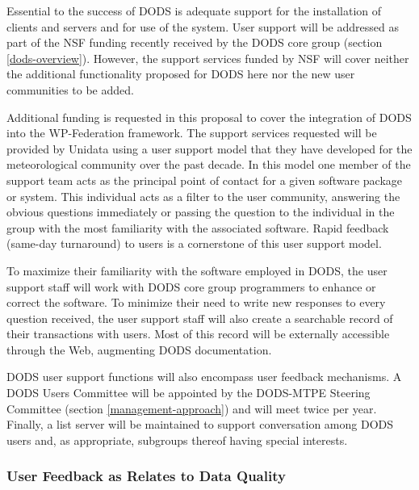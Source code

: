 \documentclass[12pt]{article}
\begin{document}
Essential to the success of \ac{DODS} is adequate support for the 
installation of clients and servers and for use of the system. User 
support will be addressed as part of the \acs{NSF} funding recently 
received by the \ac{DODS} core group (section \ref{dods-overview}).
However, the support services funded by \acs{NSF} will cover neither
the additional functionality proposed for \ac{DODS} here nor the new 
user communities to be added. 

Additional funding is requested in this proposal to cover the 
integration of \ac{DODS} into the WP-Federation framework. The 
support services requested will be provided by Unidata using a user 
support model that they have developed for the meteorological 
community over the past decade. In this model one member of the 
support team acts as the principal point of contact for a given 
software package or system. This individual acts as 
a filter to the user community, answering the obvious questions 
immediately or passing the question to the individual in the group 
with the most familiarity with the associated software. Rapid 
feedback (same-day turnaround) to users is a cornerstone of this 
user support model.
 
To maximize their familiarity with the software employed in \ac{DODS}, 
the user support staff will work with \ac{DODS} core group programmers
to enhance or correct the software. To minimize their need to 
write new responses to every question received, the user support staff 
will also create a searchable record of their transactions with users.  
Most of this record will be externally accessible through the Web, 
augmenting \ac{DODS} documentation.

\ac{DODS} user support functions will also encompass user feedback 
mechanisms. A \ac{DODS} Users Committee will be appointed by the 
\ac{DODS}-\acs{MTPE} Steering Committee (section 
\ref{management-approach}) and will meet twice per year. Finally, a 
list server will be maintained to support conversation among \ac{DODS} 
users and, as appropriate, subgroups thereof having special interests.

\subsubsection{User Feedback as Relates to Data Quality}
\label{data-quality}
\end{document}
